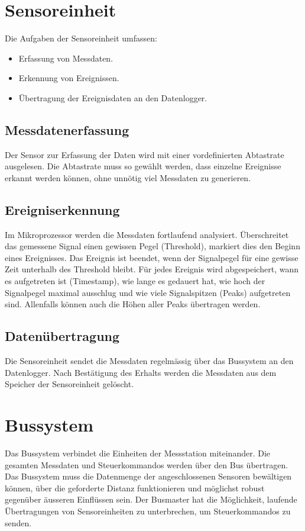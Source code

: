 \section{Sensoreinheit}
Die Aufgaben der Sensoreinheit umfassen:
\begin{itemize}
\item Erfassung von Messdaten.
\item Erkennung von Ereignissen.
\item Übertragung der Ereignisdaten an den Datenlogger.
\end{itemize}

\subsection{Messdatenerfassung}
Der Sensor zur Erfassung der Daten wird mit einer vordefinierten Abtastrate ausgelesen. Die Abtastrate muss so gewählt werden, dass einzelne Ereignisse erkannt werden können, ohne unnötig viel Messdaten zu generieren.

\subsection{Ereigniserkennung}
Im Mikroprozessor werden die Messdaten fortlaufend analysiert. Überschreitet das gemessene Signal einen gewissen Pegel (Threshold), markiert dies den Beginn eines Ereignisses. Das Ereignis ist beendet, wenn der Signalpegel für eine gewisse Zeit unterhalb des Threshold bleibt. Für jedes Ereignis wird abgespeichert, wann es aufgetreten ist (Timestamp), wie lange es gedauert hat, wie hoch der Signalpegel maximal ausschlug und wie viele Signalspitzen (Peaks) aufgetreten sind. Allenfalls können auch die Höhen aller Peaks übertragen werden.

\subsection{Datenübertragung}
Die Sensoreinheit sendet die Messdaten regelmässig über das Bussystem an den Datenlogger. Nach Bestätigung des Erhalts werden die Messdaten aus dem Speicher der Sensoreinheit gelöscht.

\section{Bussystem}
Das Bussystem verbindet die Einheiten der Messstation miteinander. Die gesamten Messdaten und Steuerkommandos werden über den Bus übertragen. Das Bussystem muss die Datenmenge der angeschlossenen Sensoren bewältigen können, über die geforderte Distanz funktionieren und möglichst robust gegenüber äusseren Einflüssen sein. Der Busmaster hat die Möglichkeit, laufende Übertragungen von Sensoreinheiten zu unterbrechen, um Steuerkommandos zu senden.